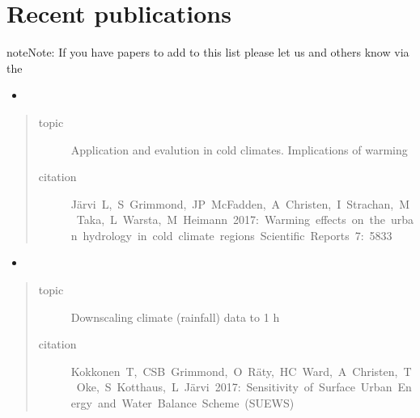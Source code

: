 \documentclass[letterpaper,10pt,english]{sphinxmanual}
\begin{document}
\chapter{Recent publications}
\label{\detokenize{recent-publications:recent-publications}}\label{\detokenize{recent-publications:index-page}}\label{\detokenize{recent-publications::doc}}\label{\detokenize{recent-publications:suews-surface-urban-energy-and-water-balance-scheme}}
\begin{sphinxadmonition}{note}{Note:}
If you have papers to add to this list please let us and others know
via the 
\end{sphinxadmonition}
\begin{itemize}
\item {} 

\end{itemize}
\begin{quote}\begin{description}
\item[{topic}] \leavevmode
Application and evalution in cold climates. Implications of warming

\item[{citation}] \leavevmode
Järvi L, S Grimmond, JP McFadden, A Christen, I Strachan, M Taka, L Warsta, M Heimann 2017: Warming effects on the urban hydrology in cold climate regions Scientific Reports 7: 5833

\end{description}\end{quote}
\begin{itemize}
\item {} 

\end{itemize}
\begin{quote}\begin{description}
\item[{topic}] \leavevmode
Downscaling climate (rainfall) data to 1 h

\item[{citation}] \leavevmode
Kokkonen T, CSB Grimmond, O Räty, HC Ward, A Christen, T Oke, S Kotthaus, L Järvi 2017: Sensitivity of Surface Urban Energy and Water Balance Scheme (SUEWS)

\end{description}\end{quote}
\end{document}
